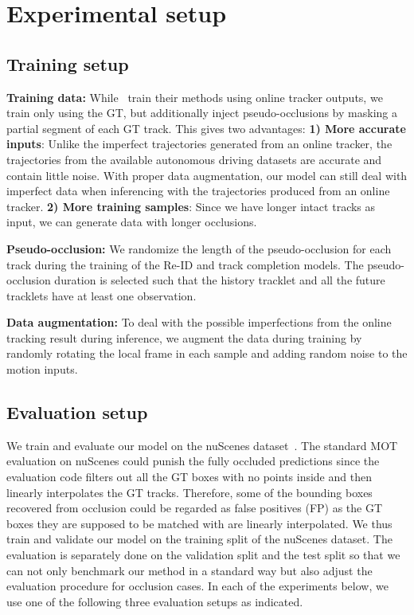 \documentclass{article} \usepackage{iclr2023_conference,times}
\begin{document}
\vspace{-1mm}
\section{Experimental setup}
\vspace{-1mm}

\subsection{Training setup}
\vspace{-1mm}
\textbf{Training data:}
While~\cite{offboard_labeling,Auto4d} train their methods using online tracker outputs, we train only using the GT, but additionally inject pseudo-occlusions by masking a partial segment of each GT track.
This gives two advantages: 
\textbf{1) More accurate inputs}:
Unlike the imperfect trajectories generated from an online tracker, the trajectories from the available autonomous driving datasets are accurate and contain little noise.
With proper data augmentation, our model can still deal with imperfect data when inferencing with the trajectories produced from an online tracker.
\textbf{2) More training samples}: Since we have longer intact tracks as input, we can generate data with longer occlusions.

\textbf{Pseudo-occlusion:} 
We randomize the length of the pseudo-occlusion for each track during the training of the Re-ID and track completion models. 
The pseudo-occlusion duration is selected such that the history tracklet and all the future tracklets have at least one observation.

\textbf{Data augmentation:} 
To deal with the possible imperfections from the online tracking result during inference, we augment the data during training by randomly rotating the local frame in each sample and adding random noise to the motion inputs. 

\subsection{Evaluation setup} 
\vspace{-1mm}
We train and evaluate our model on the nuScenes dataset~\cite{nuscenes}. 
The standard MOT evaluation on nuScenes could punish the fully occluded predictions since the evaluation code filters out all the GT boxes with no points inside and then linearly interpolates the GT tracks. Therefore, some of the bounding boxes recovered from occlusion could be regarded as false positives (FP) as the GT boxes they are supposed to be matched with are linearly interpolated. We thus train and validate our model on the training split of the nuScenes dataset. The evaluation is separately done on the validation split and the test split so that we can not only benchmark our method in a standard way but also adjust the evaluation procedure for occlusion cases. 
In each of the experiments below, we use one of the following three evaluation setups as indicated.
\end{document}
